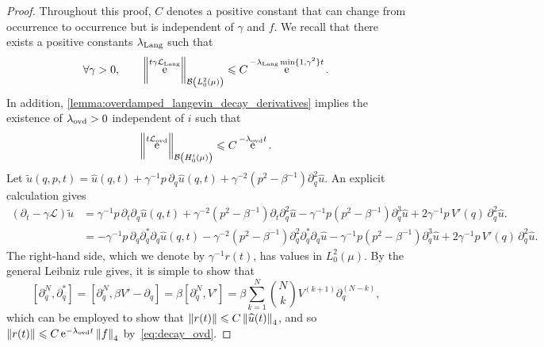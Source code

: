 \documentclass[11pt,a4paper]{article}
\DeclareMathOperator{\e}{e}
\newcommand{\commut}[2]{[#1, #2]}
\theoremstyle{plain}
\numberwithin{equation}{section}
\renewcommand{\leq}{\leqslant}
\begin{document}
\begin{proof}
    Throughout this proof, $C$ denotes a positive constant that can change from occurrence to occurrence but is independent of $\gamma$ and $f$.
    We recall that there exists a positive constants $\lambda_{\rm Lang}$ such that~\cite{roussel2018spectral,pavliotis2011applied}
    \begin{equation}
        \label{eq:decay_langevin}
        \forall \gamma > 0, \qquad
        \norm{\e^{t \gamma \mathcal L_{\rm Lang}}}[\mathcal B\left(L^2_0(\mu)\right)] \leq C \e^{- \lambda_{\rm Lang} \min\{1,\gamma^2\} t}.
    \end{equation}
    In addition, \cref{lemma:overdamped_langevin_decay_derivatives} implies the existence of $\lambda_{\rm ovd} > 0$ independent of $i$ such that
    \begin{equation}
        \label{eq:decay_ovd}
        \norm{\e^{t \mathcal L_{\rm ovd}}}[\mathcal B\left(H^i_0(\mu)\right)] \leq C \e^{- \lambda_{\rm ovd} t}.
    \end{equation}
    Let
    \(
        \widetilde u(q, p, t) =
        \widehat u(q, t)
        + \gamma^{-1} p \, \partial_q \widehat u(q, t)
        + \gamma^{-2} (p^2 - \beta^{-1}) \partial_q^{2} \widehat u.
    \)
    An explicit calculation gives
    \begin{align*}
        (\partial_t - \gamma \mathcal L) \widetilde u
        &= \gamma^{-1} p \, \partial_t \partial_q \widehat u(q, t) + \gamma^{-2} (p^2 - \beta^{-1}) \partial_t \partial_q^{2} \widehat u
        - \gamma^{-1} p (p^2 - \beta^{-1}) \partial_q^{3} \widehat u + 2 \gamma^{-1} p \, V'(q) \, \partial_q^2 \widehat u.\\
        &= - \gamma^{-1} p \, \partial_q \partial_q^* \partial_q \widehat u(q, t) - \gamma^{-2} (p^2 - \beta^{-1})  \partial_q^{2} \partial_q^* \partial_q \widehat u
        - \gamma^{-1} p (p^2 - \beta^{-1}) \partial_q^{3} \widehat u + 2 \gamma^{-1} p \, V'(q) \, \partial_q^2 \widehat u.
    \end{align*}
    The right-hand side, which we denote by $\gamma^{-1} r(t)$, has values in $L^2_0(\mu)$.
    By the general Leibniz rule gives,
    it is simple to show that
    \[
        \commut{\partial_q^N}{\partial_q^*}
        = \commut{\partial_q^N}{\beta V' - \partial_q}
        = \beta \commut{\partial_q^N}{V'}
        = \beta \sum_{k=1}^{N} {N \choose k} V^{(k+1)} \partial_q^{(N-k)},
    \]
    which can be employed to show that $\norm{r(t)} \leq C \norm{\widehat u(t)}_4$,
    and so $\norm{r(t)} \leq C \e^{-\lambda_{\rm ovd} t} \norm{f}_4$ by~\eqref{eq:decay_ovd}.

\end{proof}
\end{document}
